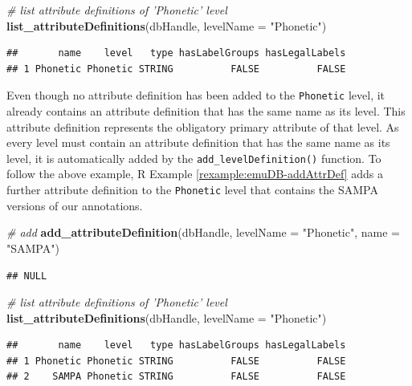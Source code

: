 \documentclass[]{book}
\newenvironment{Shaded}{\begin{snugshade}}{\end{snugshade}}
\newcommand{\CommentTok}[1]{\textcolor[rgb]{0.56,0.35,0.01}{\textit{#1}}}
\newcommand{\DataTypeTok}[1]{\textcolor[rgb]{0.13,0.29,0.53}{#1}}
\newcommand{\KeywordTok}[1]{\textcolor[rgb]{0.13,0.29,0.53}{\textbf{#1}}}
\newcommand{\NormalTok}[1]{#1}
\newcommand{\StringTok}[1]{\textcolor[rgb]{0.31,0.60,0.02}{#1}}
\theoremstyle{definition}
\theoremstyle{definition}
\theoremstyle{definition}
\theoremstyle{remark}
\begin{document}
\begin{Shaded}
\begin{Highlighting}[]
\CommentTok{# list attribute definitions of 'Phonetic' level}
\KeywordTok{list_attributeDefinitions}\NormalTok{(dbHandle,}
                          \DataTypeTok{levelName =} \StringTok{"Phonetic"}\NormalTok{)}
\end{Highlighting}
\end{Shaded}

\begin{verbatim}
##       name    level   type hasLabelGroups hasLegalLabels
## 1 Phonetic Phonetic STRING          FALSE          FALSE
\end{verbatim}

Even though no attribute definition has been added to the
\texttt{Phonetic} level, it already contains an attribute definition
that has the same name as its level. This attribute definition
represents the obligatory primary attribute of that level. As every
level must contain an attribute definition that has the same name as its
level, it is automatically added by the \texttt{add\_levelDefinition()}
function. To follow the above example, R Example
\ref{rexample:emuDB-addAttrDef} adds a further attribute definition to
the \texttt{Phonetic} level that contains the SAMPA versions of our
annotations.

\begin{Shaded}
\begin{Highlighting}[]
\CommentTok{# add}
\KeywordTok{add_attributeDefinition}\NormalTok{(dbHandle,}
                        \DataTypeTok{levelName =} \StringTok{"Phonetic"}\NormalTok{,}
                        \DataTypeTok{name =} \StringTok{"SAMPA"}\NormalTok{)}
\end{Highlighting}
\end{Shaded}

\begin{verbatim}
## NULL
\end{verbatim}

\begin{Shaded}
\begin{Highlighting}[]
\CommentTok{# list attribute definitions of 'Phonetic' level}
\KeywordTok{list_attributeDefinitions}\NormalTok{(dbHandle,}
                          \DataTypeTok{levelName =} \StringTok{"Phonetic"}\NormalTok{)}
\end{Highlighting}
\end{Shaded}

\begin{verbatim}
##       name    level   type hasLabelGroups hasLegalLabels
## 1 Phonetic Phonetic STRING          FALSE          FALSE
## 2    SAMPA Phonetic STRING          FALSE          FALSE
\end{verbatim}
\end{document}
